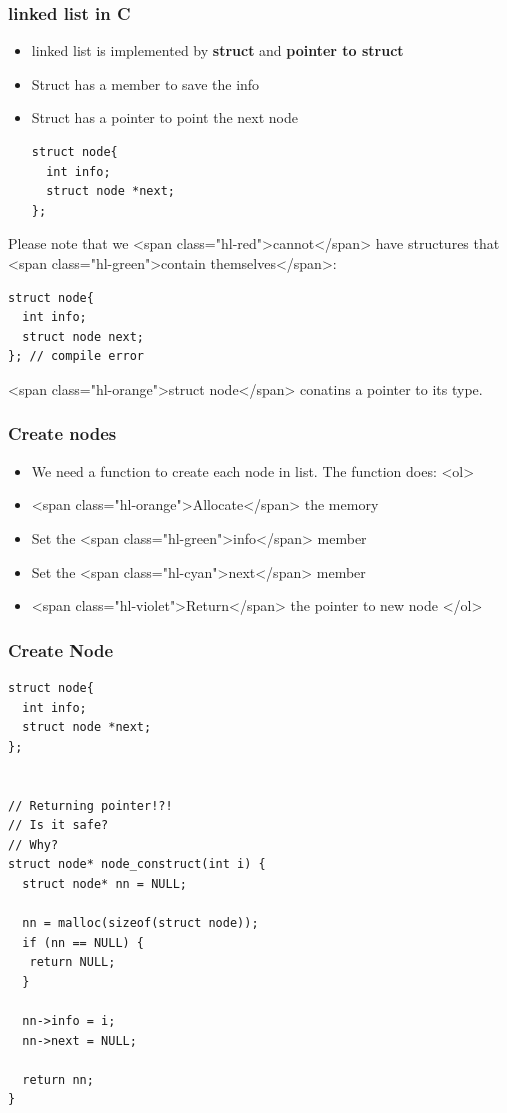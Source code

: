 \documentclass{../c-lecture}
\begin{document}
\begin{frame}[fragile]
  \frametitle{linked list in C}
  \begin{itemize}
    \item
      linked list is implemented by
      \textbf{\color{YellowOrange} struct} and
      \textbf{\color{LimeGreen} pointer to struct}
    \item Struct has a member to save the info
    \item Struct has a pointer to point the next node
    \begin{verbatim}
struct node{
  int info;
  struct node *next;
};
    \end{verbatim}
  \end{itemize}
\end{frame}

\begin{frame}[fragile]
  \begin{block}{}
    Please note that we <span class="hl-red">cannot</span> have structures that
    <span class="hl-green">contain themselves</span>:
  \end{block}
  \begin{verbatim}
struct node{
  int info;
  struct node next;
}; // compile error
  \end{verbatim}
  \begin{block}{}
    <span class="hl-orange">struct node</span> conatins a pointer to its type.
  \end{block}
\end{frame}

\begin{frame}
  \frametitle{Create nodes}
  \begin{itemize}
    \item We need a function to create each node in list. The function does:
    <ol>
      \item <span class="hl-orange">Allocate</span> the memory
      \item Set the <span class="hl-green">info</span> member
      \item Set the <span class="hl-cyan">next</span> member
      \item <span class="hl-violet">Return</span> the pointer to new node
    </ol>
  \end{itemize}
\end{frame}

\begin{frame}[fragile]
  \frametitle{Create Node}
  \begin{verbatim}
struct node{
  int info;
  struct node *next;
};


// Returning pointer!?!
// Is it safe?
// Why?
struct node* node_construct(int i) {
  struct node* nn = NULL;

  nn = malloc(sizeof(struct node));
  if (nn == NULL) {
   return NULL;
  }

  nn->info = i;
  nn->next = NULL;

  return nn;
}
  \end{verbatim}
\end{frame}
\end{document}
